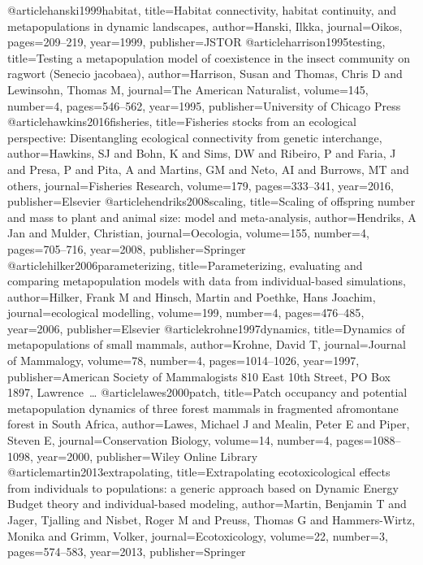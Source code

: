 @article{hanski1999habitat,
	title={Habitat connectivity, habitat continuity, and metapopulations in dynamic landscapes},
	author={Hanski, Ilkka},
	journal={Oikos},
	pages={209--219},
	year={1999},
	publisher={JSTOR}
}
@article{harrison1995testing,
	title={Testing a metapopulation model of coexistence in the insect community on ragwort (Senecio jacobaea)},
	author={Harrison, Susan and Thomas, Chris D and Lewinsohn, Thomas M},
	journal={The American Naturalist},
	volume={145},
	number={4},
	pages={546--562},
	year={1995},
	publisher={University of Chicago Press}
}
@article{hawkins2016fisheries,
	title={Fisheries stocks from an ecological perspective: Disentangling ecological connectivity from genetic interchange},
	author={Hawkins, SJ and Bohn, K and Sims, DW and Ribeiro, P and Faria, J and Presa, P and Pita, A and Martins, GM and Neto, AI and Burrows, MT and others},
	journal={Fisheries Research},
	volume={179},
	pages={333--341},
	year={2016},
	publisher={Elsevier}
}
@article{hendriks2008scaling,
	title={Scaling of offspring number and mass to plant and animal size: model and meta-analysis},
	author={Hendriks, A Jan and Mulder, Christian},
	journal={Oecologia},
	volume={155},
	number={4},
	pages={705--716},
	year={2008},
	publisher={Springer}
}
@article{hilker2006parameterizing,
	title={Parameterizing, evaluating and comparing metapopulation models with data from individual-based simulations},
	author={Hilker, Frank M and Hinsch, Martin and Poethke, Hans Joachim},
	journal={ecological modelling},
	volume={199},
	number={4},
	pages={476--485},
	year={2006},
	publisher={Elsevier}
}
@article{krohne1997dynamics,
	title={Dynamics of metapopulations of small mammals},
	author={Krohne, David T},
	journal={Journal of Mammalogy},
	volume={78},
	number={4},
	pages={1014--1026},
	year={1997},
	publisher={American Society of Mammalogists 810 East 10th Street, PO Box 1897, Lawrence~…}
}
@article{lawes2000patch,
	title={Patch occupancy and potential metapopulation dynamics of three forest mammals in fragmented afromontane forest in South Africa},
	author={Lawes, Michael J and Mealin, Peter E and Piper, Steven E},
	journal={Conservation Biology},
	volume={14},
	number={4},
	pages={1088--1098},
	year={2000},
	publisher={Wiley Online Library}
}
@article{martin2013extrapolating,
	title={Extrapolating ecotoxicological effects from individuals to populations: a generic approach based on Dynamic Energy Budget theory and individual-based modeling},
	author={Martin, Benjamin T and Jager, Tjalling and Nisbet, Roger M and Preuss, Thomas G and Hammers-Wirtz, Monika and Grimm, Volker},
	journal={Ecotoxicology},
	volume={22},
	number={3},
	pages={574--583},
	year={2013},
	publisher={Springer}
}
